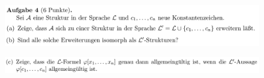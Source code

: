 \documentclass[a4paper]{scrartcl}
\begin{document}
\section*{}%
\label{sec:aufgabe_4}

    \begin{figure}[H]
        \centering
        \includegraphics[scale=0.3]{./A-4-1.png}
        \label{fig:}
    \end{figure}

    \begin{figure}[H]
        \centering
        \includegraphics[scale=0.3]{./A-4-2.png}
        \label{fig:}
    \end{figure}
\end{document}
